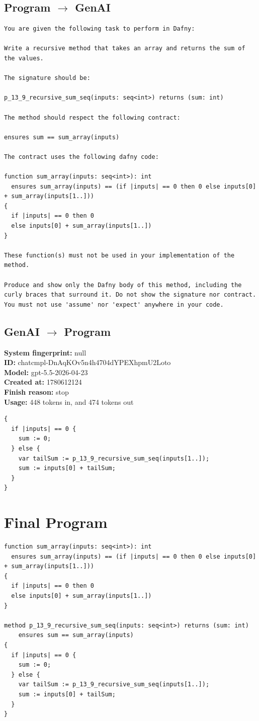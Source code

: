 \documentclass{article}
\begin{document}
\subsection*{Program $\rightarrow$ GenAI}
\begin{lstlisting}
You are given the following task to perform in Dafny:

Write a recursive method that takes an array and returns the sum of the values.

The signature should be:

p_13_9_recursive_sum_seq(inputs: seq<int>) returns (sum: int)

The method should respect the following contract:

ensures sum == sum_array(inputs)

The contract uses the following dafny code:

function sum_array(inputs: seq<int>): int
  ensures sum_array(inputs) == (if |inputs| == 0 then 0 else inputs[0] + sum_array(inputs[1..]))
{
  if |inputs| == 0 then 0
  else inputs[0] + sum_array(inputs[1..])
}

These function(s) must not be used in your implementation of the method.

Produce and show only the Dafny body of this method, including the curly braces that surround it. Do not show the signature nor contract. You must not use 'assume' nor 'expect' anywhere in your code.
\end{lstlisting}
\subsection*{GenAI $\rightarrow$ Program}
\textbf{System fingerprint: }null
\\\textbf{ID: }chatcmpl-DnAqKOv5n4h4704dYPEXhpmU2Loto
\\\textbf{Model: }gpt-5.5-2026-04-23
\\\textbf{Created at: }1780612124
\\\textbf{Finish reason: }stop
\\\textbf{Usage: }448 tokens in, and 474 tokens out
\begin{lstlisting}
{
  if |inputs| == 0 {
    sum := 0;
  } else {
    var tailSum := p_13_9_recursive_sum_seq(inputs[1..]);
    sum := inputs[0] + tailSum;
  }
}
\end{lstlisting}
\section*{Final Program}
\begin{lstlisting}
function sum_array(inputs: seq<int>): int
  ensures sum_array(inputs) == (if |inputs| == 0 then 0 else inputs[0] + sum_array(inputs[1..]))
{
  if |inputs| == 0 then 0
  else inputs[0] + sum_array(inputs[1..])
}

method p_13_9_recursive_sum_seq(inputs: seq<int>) returns (sum: int)
	ensures sum == sum_array(inputs)
{
  if |inputs| == 0 {
    sum := 0;
  } else {
    var tailSum := p_13_9_recursive_sum_seq(inputs[1..]);
    sum := inputs[0] + tailSum;
  }
}
\end{lstlisting}
\end{document}
